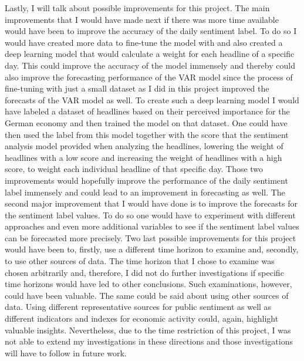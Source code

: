 \documentclass[11pt, a4paper, leqno]{article}
\begin{document}
Lastly, I will talk about possible improvements for this project.
The main improvements that I would have made next if there was more time available would have been to improve the accuracy of the daily sentiment label. To do so I would have created more data to fine-tune the model with and also created a deep learning model that would calculate a weight for each headline of a specific day. This could improve the accuracy of the model immensely and thereby could also improve the forecasting performance of the VAR model since the process of fine-tuning with just a small dataset as I did in this project improved the forecasts of the VAR model as well. To create such a deep learning model I would have labeled a dataset of headlines based on their perceived importance for the German economy and then trained the model on that dataset. One could have then used the label from this model together with the score that the sentiment analysis model provided when analyzing the headlines, lowering the weight of headlines with a low score and increasing the weight of headlines with a high score, to weight each individual headline of that specific day. Those two improvements would hopefully improve the performance of the daily sentiment label immensely and could lead to an improvement in forecasting as well.
The second major improvement that I would have done is to improve the forecasts for the sentiment label values. To do so one would have to experiment with different approaches and even more additional variables to see if the sentiment label values can be forecasted more precisely.
Two last possible improvements for this project would have been to, firstly, use a different time horizon to examine and, secondly, to use other sources of data. The time horizon that I chose to examine was chosen arbitrarily and, therefore, I did not do further investigations if specific time horizons would have led to other conclusions. Such examinations, however, could have been valuable.
The same could be said about using other sources of data. Using different representative sources for public sentiment as well as different indicators and indexes for economic activity could, again, highlight valuable insights. Nevertheless, due to the time restriction of this project, I was not able to extend my investigations in these directions and those investigations will have to follow in future work.


\printbibliography
{}



\end{document}
